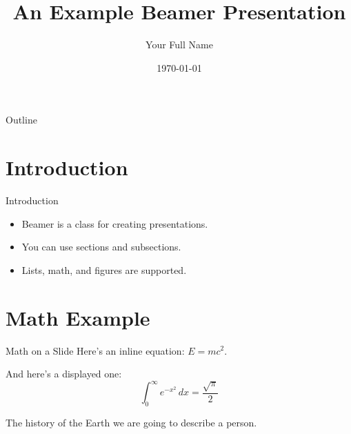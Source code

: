 \documentclass{beamer}
\title[Short Title]{An Example Beamer Presentation}
\author[Your Name]{Your Full Name}
\institute[Your School]{Pierre Elliott Trudeau High School}
\date{\today}
\begin{document}
\begin{frame}
  \titlepage
\end{frame}

\begin{frame}{Outline}
  \tableofcontents
\end{frame}

\section{Introduction}
\begin{frame}{Introduction}
  \begin{itemize}
    \item Beamer is a class for creating presentations.
    \item You can use sections and subsections.
    \item Lists, math, and figures are supported.
  \end{itemize}
\end{frame}

\section{Math Example}
\begin{frame}{Math on a Slide}
  Here’s an inline equation: $E = mc^2$.

  \vspace{1em}

  And here’s a displayed one:
  \[
    \int_{0}^{\infty} e^{-x^2} \, dx = \frac{\sqrt{\pi}}{2}
  \]
\end{frame}

\begin{frame}{The history of the Earth}
    we are going to describe a person. 
    \begin{center}
        
    \end{center}
\end{frame}
\end{document}
